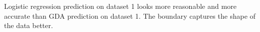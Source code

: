 \begin{answer}
    Logistic regression prediction on dataset 1 looks more reasonable
    and more accurate than GDA prediction on dataset 1. The boundary captures
    the shape of the data better.
\end{answer}
